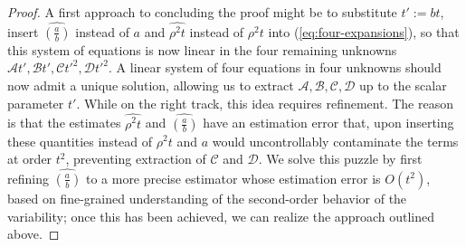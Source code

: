 \begin{proof}
A first approach to concluding the proof might be to substitute $t' := bt$, insert $\widehat{(\frac{a}{b})}$ instead of $a$ and $\widehat{\rho^2t}$ instead of $\rho^2t$ into (\ref{eq:four-expansions}), so that this system of equations is now linear in the four remaining unknowns $\mathcal{A}t', \mathcal{B}t', \mathcal{C}t'^2, \mathcal{D}t'^2$. A linear system of four equations in four unknowns should now admit a unique solution, allowing us to extract $\mathcal{A}, \mathcal{B}, \mathcal{C}, \mathcal{D}$ up to the scalar parameter $t'$. While on the right track, this idea requires refinement. The reason is that the estimates $\widehat{\rho^2t}$ and $\widehat{(\frac{a}{b})}$ have an estimation error that, upon inserting these quantities instead of $\rho^2t$ and $a$ would uncontrollably contaminate the terms at order $t^2$, preventing extraction of $\mathcal{C}$ and $\mathcal{D}$. We solve this puzzle by first refining $\widehat{(\frac{a}{b})}$ to a more precise estimator whose estimation error is $O(t^2)$, based on fine-grained understanding of the second-order behavior of the variability; once this has been achieved, we can realize the approach outlined above.





\end{proof}
